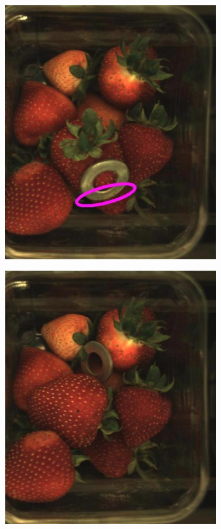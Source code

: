 \documentclass[fleqn,twoside,12pt]{report}
\begin{document}
\begin{figure}[h]
\begin{subfigure}{.25\textwidth}
		\caption{}
		\label{fig:fo_washer_2}
	\end{subfigure}%
	\begin{subfigure}{.25\textwidth}
		\centering
		\includegraphics[width=.9\linewidth]{fo_washer_3.jpg}
		\caption{}
		\label{fig:fo_washer_3}
	\end{subfigure}%
	\begin{subfigure}{.25\textwidth}
		\centering
		\includegraphics[width=.9\linewidth]{fo_washer_4.jpg}
		\caption{}
		\label{fig:fo_washer_4}
	\end{subfigure}%
	

\end{figure}
\end{document}
